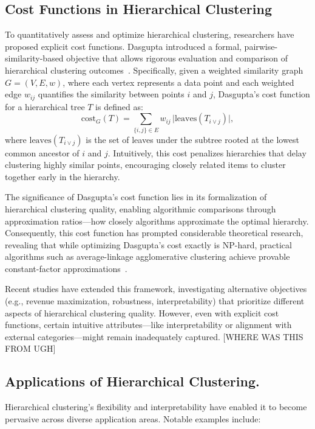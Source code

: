 \subsection{Cost Functions in Hierarchical Clustering}\label{subsec:hierarchical_clustering_cost}

To quantitatively assess and optimize hierarchical clustering, researchers have proposed explicit cost functions. Dasgupta introduced a formal, pairwise-similarity-based objective that allows rigorous evaluation and comparison of hierarchical clustering outcomes~\cite{dasgupta2016cost}. Specifically, given a weighted similarity graph \( G=(V,E,w) \), where each vertex represents a data point and each weighted edge \( w_{ij} \) quantifies the similarity between points \( i \) and \( j \), Dasgupta’s cost function for a hierarchical tree \( T \) is defined as:
\[
\text{cost}_G(T) = \sum_{\{i,j\}\in E} w_{ij}\,\big|\text{leaves}(T_{i \vee j})\big|,
\]
where \( \text{leaves}(T_{i \vee j}) \) is the set of leaves under the subtree rooted at the lowest common ancestor of \( i \) and \( j \). Intuitively, this cost penalizes hierarchies that delay clustering highly similar points, encouraging closely related items to cluster together early in the hierarchy.

The significance of Dasgupta’s cost function lies in its formalization of hierarchical clustering quality, enabling algorithmic comparisons through approximation ratios—how closely algorithms approximate the optimal hierarchy. Consequently, this cost function has prompted considerable theoretical research, revealing that while optimizing Dasgupta’s cost exactly is NP-hard, practical algorithms such as average-linkage agglomerative clustering achieve provable constant-factor approximations~\cite{charikar2019hierarchical}.

Recent studies have extended this framework, investigating alternative objectives (e.g., revenue maximization, robustness, interpretability) that prioritize different aspects of hierarchical clustering quality. However, even with explicit cost functions, certain intuitive attributes—like interpretability or alignment with external categories—might remain inadequately captured. [WHERE WAS THIS FROM UGH]


\subsection{Applications of Hierarchical Clustering.}
Hierarchical clustering's flexibility and interpretability have enabled it to become pervasive across diverse application areas. Notable examples include:

